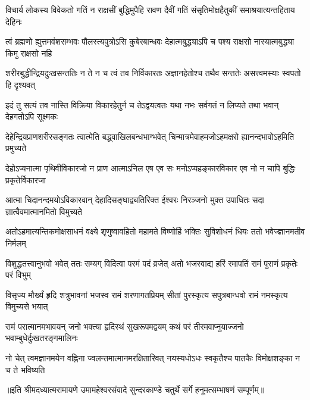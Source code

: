 


\addtocounter{shlokacount}{14}

\fourlineindentedshloka
{विचार्य लोकस्य विवेकतो गतिं}
{न राक्षसीं बुद्धिमुपैहि रावण}
{दैवीं गतिं संसृतिमोक्षहैतुकीं}
{समाश्रयात्यन्तहिताय देहिनः} %

\fourlineindentedshloka
{त्वं ब्रह्मणो ह्युत्तमवंशसम्भवः}
{पौलस्त्यपुत्रोऽसि कुबेरबान्धवः}
{देहात्मबुद्ध्याऽपि च पश्य राक्षसो}
{नास्यात्मबुद्ध्या किमु राक्षसो नहि} %

\fourlineindentedshloka
{शरीरबुद्धीन्द्रियदुःखसन्ततिः}
{न ते न च त्वं तव निर्विकारतः}
{अज्ञानहेतोश्च तथैव सन्ततेः}
{असत्त्वमस्याः स्वपतो हि दृश्यवत्} %

\fourlineindentedshloka
{इदं तु सत्यं तव नास्ति विक्रिया}
{विकारहेतुर्न च तेऽद्वयत्वतः}
{यथा नभः सर्वगतं न लिप्यते}
{तथा भवान् देहगतोऽपि सूक्ष्मकः}

\fourlineindentedshloka
{देहेन्द्रियप्राणशरीरसङ्गतः}
{त्वात्मेति बद्\mbox{}ध्वाखिलबन्धभाग्भवेत्} %
{चिन्मात्रमेवाहमजोऽहमक्षरो}
{ह्यानन्दभावोऽहमिति प्रमुच्यते}

\fourlineindentedshloka
{देहोऽप्यनात्मा पृथिवीविकारजो}
{न प्राण आत्माऽनिल एष एव सः} %
{मनोऽप्यहङ्कारविकार एव नो}
{न चापि बुद्धिः प्रकृतेर्विकारजा}

\fourlineindentedshloka
{आत्मा चिदानन्दमयोऽविकारवान्}
{देहादिसङ्घाद्व्यतिरिक्त ईश्वरः} %
{निरञ्जनो मुक्त उपाधितः सदा}
{ज्ञात्वैवमात्मानमितो विमुच्यते}

\fourlineindentedshloka
{अतोऽहमात्यन्तिकमोक्षसाधनं}
{वक्ष्ये शृणुष्वावहितो महामते} %
{विष्णोर्हि भक्तिः सुविशोधनं धियः}
{ततो भवेज्ज्ञानमतीव निर्मलम्}

\fourlineindentedshloka
{विशुद्धतत्त्वानुभवो भवेत् ततः}
{सम्यग् विदित्वा परमं पदं व्रजेत्} %
{अतो भजस्वाद्य हरिं रमापतिं}
{रामं पुराणं प्रकृतेः परं विभुम्}

\fourlineindentedshloka
{विसृज्य मौर्ख्यं हृदि शत्रुभावनां}
{भजस्व रामं शरणागतप्रियम्}
{सीतां पुरस्कृत्य सपुत्रबान्धवो}
{रामं नमस्कृत्य विमुच्यसे भयात्} %

\fourlineindentedshloka
{रामं परात्मानमभावयन् जनो}
{भक्त्या हृदिस्थं सुखरूपमद्वयम्}
{कथं परं तीरमवाप्नुयाज्जनो}
{भवाम्बुधेर्दुःखतरङ्गमालिनः} %

\fourlineindentedshloka
{नो चेत् त्वमज्ञानमयेन वह्निना}
{ज्वलन्तमात्मानमरक्षितारिवत्}
{नयस्यधोऽधः स्वकृतैश्च पातकैः}
{विमोक्षशङ्का न च ते भविष्यति} %

{॥इति श्रीमदध्यात्मरामायणे उमामहेश्वरसंवादे सुन्दरकाण्डे
चतुर्थे सर्गे हनूमत्सम्भाषणं सम्पूर्णम्॥}
